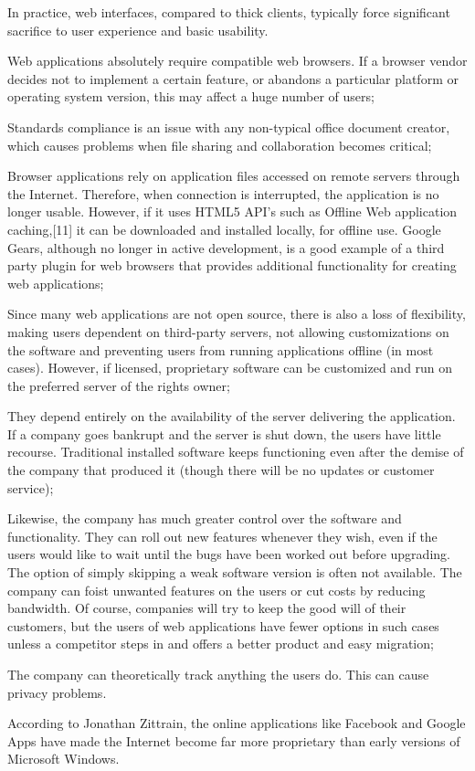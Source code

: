 \begin{compactitem}
\item In practice, web interfaces, compared to thick clients, typically force significant sacrifice to user experience and basic usability.
\item Web applications absolutely require compatible web browsers. If a browser vendor decides not to implement a certain feature, or abandons a particular platform or operating system version, this may affect a huge number of users;
\item Standards compliance is an issue with any non-typical office document creator, which causes problems when file sharing and collaboration becomes critical;
\item Browser applications rely on application files accessed on remote servers through the Internet. Therefore, when connection is interrupted, the application is no longer usable. However, if it uses HTML5 API's such as Offline Web application caching,[11] it can be downloaded and installed locally, for offline use. Google Gears, although no longer in active development, is a good example of a third party plugin for web browsers that provides additional functionality for creating web applications;
\item Since many web applications are not open source, there is also a loss of flexibility, making users dependent on third-party servers, not allowing customizations on the software and preventing users from running applications offline (in most cases). However, if licensed, proprietary software can be customized and run on the preferred server of the rights owner;
\item They depend entirely on the availability of the server delivering the application. If a company goes bankrupt and the server is shut down, the users have little recourse. Traditional installed software keeps functioning even after the demise of the company that produced it (though there will be no updates or customer service);
\item Likewise, the company has much greater control over the software and functionality. They can roll out new features whenever they wish, even if the users would like to wait until the bugs have been worked out before upgrading. The option of simply skipping a weak software version is often not available. The company can foist unwanted features on the users or cut costs by reducing bandwidth. Of course, companies will try to keep the good will of their customers, but the users of web applications have fewer options in such cases unless a competitor steps in and offers a better product and easy migration;
\item The company can theoretically track anything the users do. This can cause privacy problems.
\item According to Jonathan Zittrain, the online applications like Facebook and Google Apps have made the Internet become far more proprietary than early versions of Microsoft Windows.
\end{compactitem}

